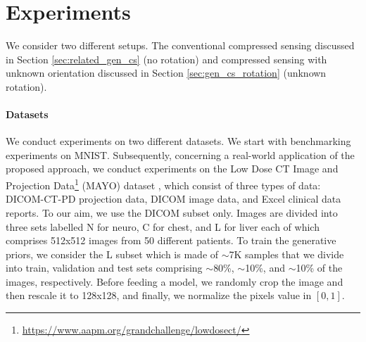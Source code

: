 \section{Experiments}\label{sec_equiv:experiments}

We consider two different setups. The conventional compressed sensing discussed in Section \ref{sec:related_gen_cs} (no rotation) and compressed sensing with unknown orientation discussed in Section \ref{sec:gen_cs_rotation} (unknown rotation).  

\paragraph{Datasets}
We conduct experiments on two different datasets. We start with benchmarking experiments on MNIST\citep{lecun1998mnist}. 
Subsequently, concerning a real-world application of the proposed approach, we conduct experiments on the Low Dose CT Image and Projection Data\footnote{\url{https://www.aapm.org/grandchallenge/lowdosect/}} (MAYO) dataset \citep{moen2021low}, which consist of three types of data: DICOM-CT-PD projection data, DICOM image data, and Excel clinical data reports. To our aim, we use the DICOM subset only. Images are divided into three sets labelled N for neuro, C for chest, and L for liver each of which comprises 512x512 images from 50 different patients. To train the generative priors, we consider the L subset which is made of $\sim$7K samples that we divide into train, validation and test sets comprising $\sim$80\%, $\sim$10\%, and $\sim$10\% of the images, respectively.
Before feeding a model, we randomly crop the image and then rescale it to 128x128, and finally, we normalize the pixels value in $[0,1]$.

